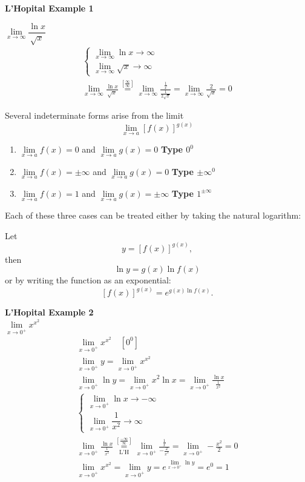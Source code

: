 \documentclass{article}
\newcommand{\theorem}[2]{\begin{tcolorbox}[title={#1},colback=blue!5!white,colframe=blue!75!black,parbox=false] #2 \end{tcolorbox}}
\begin{document}
\textbf{L'Hopital Example 1}

$\lim\limits_{x\to \infty}\dfrac{\ln x}{\sqrt{x}}$
\begin{gather*}
    \begin{cases}
        \lim\limits_{x\to \infty}\ln x\to \infty\\
        \lim\limits_{x\to \infty}\sqrt{x} \to \infty
    \end{cases}\\
    \lim\limits_{x\to \infty}\frac{\ln x}{\sqrt{x}}\overset{[\frac{\infty{}}{\infty}]}{=}\lim\limits_{x\to \infty}\frac{\frac{1}{x}}{\frac{1}{2\sqrt{x}}}=\lim\limits_{x\to \infty}\frac{2}{\sqrt{x}}=\boxed{0}
\end{gather*}

\theorem{ Indeterminate Powers: $0^0, \infty^0, 1^\infty$ } {Several indeterminate forms arise from the limit$$ \lim_{x \to a} [f(x)]^{g(x)} $$
\begin{enumerate}
    \item $\lim\limits_{x \to a} f(x) = 0$ and $\lim\limits_{x \to a} g(x) = 0$ \hfill \textbf{Type $0^0$}
    \item $\lim\limits_{x \to a} f(x) = \pm\infty$ and $\lim\limits_{x \to a} g(x) = 0$ \hfill \textbf{Type $\pm\infty^0$}
    \item $\lim\limits_{x \to a} f(x) = 1$ and $\lim\limits_{x \to a} g(x) = \pm\infty$ \hfill \textbf{Type $1^{\pm\infty}$}
\end{enumerate}
Each of these three cases can be treated either by taking the natural logarithm:

Let$$ y = [f(x)]^{g(x)}, $$then$$ \ln y = g(x) \ln f(x) $$or by writing the function as an exponential:$$ [f(x)]^{g(x)} = e^{g(x) \ln f(x)}. $$}

\textbf{L'Hopital Example 2}\\
$\lim\limits_{x \to 0^+} x^{x^2}$
\begin{gather*}
    \lim\limits_{x \to 0^+} x^{x^2} \quad [0^0]\\
    \lim_{x \to 0^+}y=\lim_{x \to 0^+}x^{x^2}\\
    \lim_{x \to 0^+}\ln y =\lim_{x \to 0^+}x^2 \ln x=\lim_{x \to 0^+}\frac{\ln x}{\frac{1}{x^2}}\\
    \begin{cases}
        \lim\limits_{x \to 0^+} \ln x \to -\infty\\
        \lim\limits_{x \to 0^+} \dfrac{1}{x^2} \to \infty
    \end{cases}\\
    \lim_{x \to 0^+}\frac{\ln x}{\frac{1}{x^2}} \underset{\text{L'H}}{\overset{\left[\frac{-\infty}{\infty}\right]}{=}}\lim_{x \to 0^+}\frac{\frac{1}{x}}{-\frac{2}{x^3}}=\lim_{x \to 0^+}-\frac{x^2}{2}=0\\
    \lim_{x \to 0^+}x^{x^2}=\lim_{x \to 0^+}y=e^{\lim_{x \to 0^+} \ln y}=e^0=\boxed{1}
\end{gather*}
\end{document}
